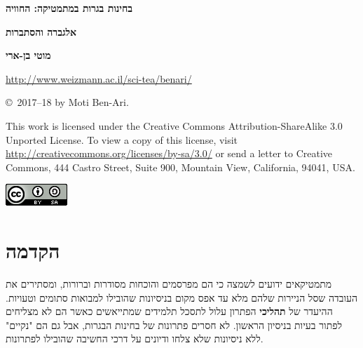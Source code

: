 

\thispagestyle{empty}

\begin{center}
\textbf{\LARGE בחינות בגרות במתמטיקה: החוויה}

\bigskip
\bigskip

\textbf{\LARGE אלגברה והסתברות}

\bigskip
\bigskip
\bigskip
\bigskip

\textbf{\Large מוטי בן-ארי}

\bigskip
\bigskip

\url{http://www.weizmann.ac.il/sci-tea/benari/}
\end{center}

\vfill


\begin{footnotesize}
\begin{center}
\copyright{}\ 2017--18 by Moti Ben-Ari.
\end{center}

This work is licensed under the Creative Commons Attribution-ShareAlike 3.0 Unported License. To view a copy of this license, visit \url{http://creativecommons.org/licenses/by-sa/3.0/} or send a letter to Creative Commons, 444 Castro Street, Suite 900, Mountain View, California, 94041, USA.
\end{footnotesize}

\bigskip

\begin{center}
\includegraphics[width=.15\textwidth]{../../by-sa.png}
\end{center}

\np
\thispagestyle{empty}
\mbox{}
\np
\thispagestyle{empty}

\tableofcontents
\np

\section*{הקדמה}

מתמטיקאים ידועים לשמצה כי הם מפרסמים והוכחות מסודרות וברורות, ומסתירים את העובדה שסל הניירות שלהם מלא עד אפס מקום בניסיונות שהובילו למבואות סתומים וטעויות. ההיעדר של 
\textbf{תהליכי}
הפתרון עלול לתסכל תלמידים שמתייאשים כאשר הם לא מצליחים לפתור בעיות בניסיון הראשון. לא חסרים פתרונות של בחינות הבגרות, אבל גם הם "נקיים" ללא ניסיונות שלא צלחו ודיונים על דרכי החשיבה שהובילו לפתרונות.

